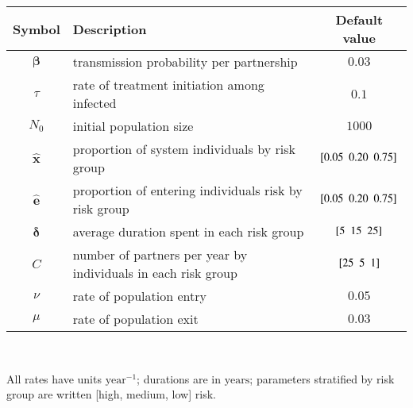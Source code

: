 \begin{tabular}{clc}
	\toprule
	    Symbol     & Description                                                     &        Default value         \\
	\midrule
	 $\bm{\beta}$  & transmission probability per partnership                        &            $0.03$            \\
	    $\tau$     & rate of treatment initiation among infected                     &            $0.1$             \\
	    $N_0$      & initial population size                                         &            $1000$            \\
	\midrule
	$\bm{\hat{x}}$ & proportion of system individuals by risk group                  & $[ 0.05 \enspace 0.20 \enspace 0.75 ]$ \\
	$\bm{\hat{e}}$ & proportion of entering individuals risk by risk group           & $[ 0.05 \enspace 0.20 \enspace 0.75 ]$ \\
	$\bm{\delta}$  & average duration spent in each risk group                       &    $[ 5 \enspace 15 \enspace 25 ]$     \\
	     $C$       & number of partners per year by individuals in each risk group   &     $[ 25 \enspace 5 \enspace 1 ]$     \\
	    $\nu$      & rate of population entry                                        &            $0.05$            \\
	    $\mu$      & rate of population exit                                         &            $0.03$            \\
	\bottomrule
\end{tabular}\\[1em]
\footnotesize\raggedright
All rates have units $\mathrm{year}^{-1}$; durations are in $\mathrm{years}$;
parameters stratified by risk group are written [high, medium, low] risk.